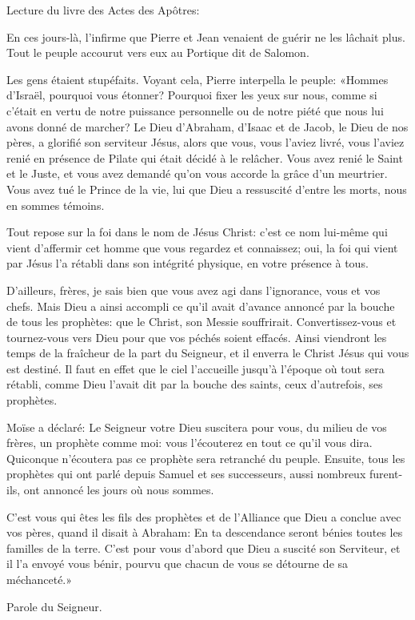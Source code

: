 \indent Lecture du livre des Actes des Apôtres:

En ces jours-là, l’infirme que Pierre et Jean venaient de guérir ne les lâchait plus. Tout le peuple accourut vers eux au Portique dit de Salomon.

Les gens étaient stupéfaits. Voyant cela, Pierre interpella le peuple: «Hommes d’Israël, pourquoi vous étonner? Pourquoi fixer les yeux sur nous, comme si c’était en vertu de notre puissance personnelle ou de notre piété que nous lui avons donné de marcher? Le Dieu d’Abraham, d’Isaac et de Jacob, le Dieu de nos pères, a glorifié son serviteur Jésus, alors que vous, vous l’aviez livré, vous l’aviez renié en présence de Pilate qui était décidé à le relâcher. Vous avez renié le Saint et le Juste, et vous avez demandé qu’on vous accorde la grâce d’un meurtrier. Vous avez tué le Prince de la vie, lui que Dieu a ressuscité d’entre les morts, nous en sommes témoins.

Tout repose sur la foi dans le nom de Jésus Christ: c’est ce nom lui-même qui vient d’affermir cet homme que vous regardez et connaissez; oui, la foi qui vient par Jésus l’a rétabli dans son intégrité physique, en votre présence à tous.

D’ailleurs, frères, je sais bien que vous avez agi dans l’ignorance, vous et vos chefs. Mais Dieu a ainsi accompli ce qu’il avait d’avance annoncé par la bouche de tous les prophètes: que le Christ, son Messie souffrirait. Convertissez-vous et tournez-vous vers Dieu pour que vos péchés soient effacés. Ainsi viendront les temps de la fraîcheur de la part du Seigneur, et il enverra le Christ Jésus qui vous est destiné. Il faut en effet que le ciel l’accueille jusqu’à l’époque où tout sera rétabli, comme Dieu l’avait dit par la bouche des saints, ceux d’autrefois, ses prophètes.

Moïse a déclaré: Le Seigneur votre Dieu suscitera pour vous, du milieu de vos frères, un prophète comme moi: vous l’écouterez en tout ce qu’il vous dira. Quiconque n’écoutera pas ce prophète sera retranché du peuple. Ensuite, tous les prophètes qui ont parlé depuis Samuel et ses successeurs, aussi nombreux furent-ils, ont annoncé les jours où nous sommes.

C’est vous qui êtes les fils des prophètes et de l’Alliance que Dieu a conclue avec vos pères, quand il disait à Abraham: En ta descendance seront bénies toutes les familles de la terre. C’est pour vous d’abord que Dieu a suscité son Serviteur, et il l’a envoyé vous bénir, pourvu que chacun de vous se détourne de sa méchanceté.»

Parole du Seigneur.